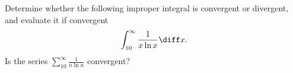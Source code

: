 \label{problemConvergenceint_10^inftyx/(xlnx)dx}
Determine whether the following improper integral is convergent or divergent, and evaluate it if convergent
\[
\int_{10}^{\infty}\frac{1}{x\ln x}\diff x.
\]
Is the series $\displaystyle \sum_{10}^\infty \frac{1}{n \ln n}$ convergent?